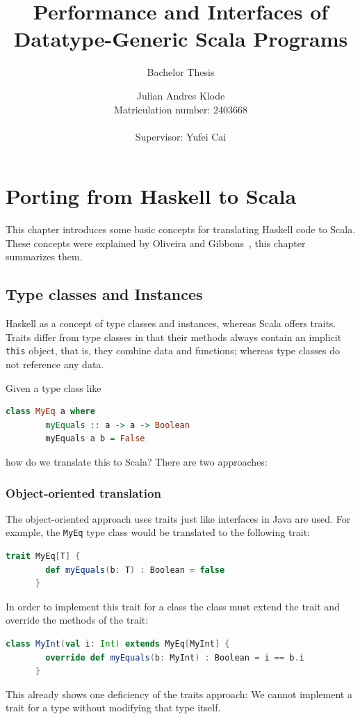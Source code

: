\documentclass[abstracton,parskip=half]{scrreprt}
\author{Julian Andres Klode\\Matriculation number: 2403668\\\\Supervisor: Yufei Cai}
\title{Performance and Interfaces of Datatype-Generic Scala Programs}
\subtitle{Bachelor Thesis}
\date{}
\newcommand{\cd}{\texttt}
\begin{document}
    \maketitle{}
    

    \tableofcontents{}
    \clearpage
    \setcounter{page}{1}

    


    \chapter{Porting from Haskell to Scala}

    This chapter introduces some basic concepts for translating Haskell code
    to Scala. These concepts were explained by Oliveira and Gibbons~\cite{scalagp}, this
    chapter summarizes them.

    \section{Type classes and Instances}

    Haskell as a concept of type classes and instances, whereas Scala offers
    traits. Traits differ from type classes in that their methods always contain
    an implicit \cd{this} object, that is, they combine data and functions;
    whereas type classes do not reference any data.

    Given a type class like
    \begin{lstlisting}[language=Haskell,gobble=6]
      class MyEq a where
        myEquals :: a -> a -> Boolean
        myEquals a b = False
    \end{lstlisting}
    how do we translate this to Scala? There are two approaches:

    \subsection{Object-oriented translation}
    The object-oriented approach uses traits just like interfaces in
    Java are used. For example, the \cd{MyEq} type class would be translated
    to the following trait:
    \begin{lstlisting}[language=Scala,gobble=6]
      trait MyEq[T] {
        def myEquals(b: T) : Boolean = false
      }
    \end{lstlisting}
    In order to implement this trait for a class the class must extend the
    trait and override the methods of the trait:
    \begin{lstlisting}[language=Scala,gobble=6]
      class MyInt(val i: Int) extends MyEq[MyInt] {
        override def myEquals(b: MyInt) : Boolean = i == b.i
      }
    \end{lstlisting}
    This already shows one deficiency of the traits approach: We cannot
    implement a trait for a type without modifying that type itself.
\end{document}
